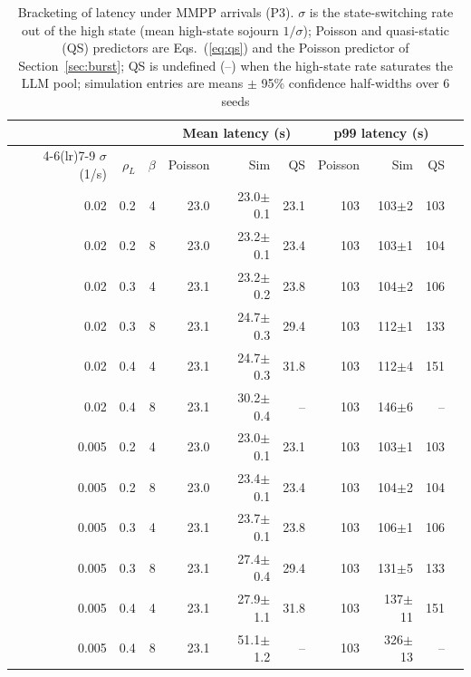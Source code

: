 \documentclass[journal]{IEEEtran}
\begin{document}
\begin{table}[t]
\caption{Bracketing of latency under MMPP arrivals (P3). $\sigma$ is the state-switching rate out of the high state (mean high-state sojourn $1/\sigma$); Poisson and quasi-static (QS) predictors are Eqs.~(\ref{eq:qs}) and the Poisson predictor of Section~\ref{sec:burst}; QS is undefined (--) when the high-state rate saturates the LLM pool; simulation entries are means $\pm$ 95\% confidence half-widths over 6 seeds}
\label{tab:bracket}
\centering
\footnotesize
\begin{tabular}{rrrrrrrrrr}
\toprule
 & & & \multicolumn{3}{c}{Mean latency (s)} & \multicolumn{3}{c}{p99 latency (s)} \\
\cmidrule(lr){4-6}\cmidrule(lr){7-9}
$\sigma$ (1/s) & $\rho_L$ & $\beta$ & Poisson & Sim & QS & Poisson & Sim & QS \\
\midrule
0.02 & 0.2 & 4 & 23.0 & 23.0$\pm$0.1 & 23.1 & 103 & 103$\pm$2 & 103 \\
0.02 & 0.2 & 8 & 23.0 & 23.2$\pm$0.1 & 23.4 & 103 & 103$\pm$1 & 104 \\
0.02 & 0.3 & 4 & 23.1 & 23.2$\pm$0.2 & 23.8 & 103 & 104$\pm$2 & 106 \\
0.02 & 0.3 & 8 & 23.1 & 24.7$\pm$0.3 & 29.4 & 103 & 112$\pm$1 & 133 \\
0.02 & 0.4 & 4 & 23.1 & 24.7$\pm$0.3 & 31.8 & 103 & 112$\pm$4 & 151 \\
0.02 & 0.4 & 8 & 23.1 & 30.2$\pm$0.4 & -- & 103 & 146$\pm$6 & -- \\
\midrule
0.005 & 0.2 & 4 & 23.0 & 23.0$\pm$0.1 & 23.1 & 103 & 103$\pm$1 & 103 \\
0.005 & 0.2 & 8 & 23.0 & 23.4$\pm$0.1 & 23.4 & 103 & 104$\pm$2 & 104 \\
0.005 & 0.3 & 4 & 23.1 & 23.7$\pm$0.1 & 23.8 & 103 & 106$\pm$1 & 106 \\
0.005 & 0.3 & 8 & 23.1 & 27.4$\pm$0.4 & 29.4 & 103 & 131$\pm$5 & 133 \\
0.005 & 0.4 & 4 & 23.1 & 27.9$\pm$1.1 & 31.8 & 103 & 137$\pm$11 & 151 \\
0.005 & 0.4 & 8 & 23.1 & 51.1$\pm$1.2 & -- & 103 & 326$\pm$13 & -- \\
\bottomrule
\end{tabular}
\end{table}
\end{document}
